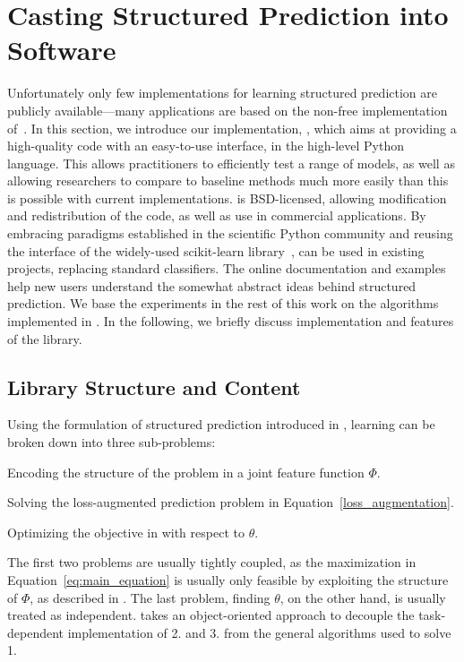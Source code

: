 \section{Casting Structured Prediction into Software}\label{sec:api}

Unfortunately only few implementations for learning structured prediction are
publicly available---many applications are based on the non-free implementation
of~\citet{joachims2009cutting}.
In this section, we introduce our implementation, \pystruct, which aims at
providing a high-quality code with an easy-to-use interface, in the high-level
Python language. This allows practitioners to efficiently test a range of
models, as well as allowing researchers to compare to baseline methods much
more easily than this is possible with current implementations. \pystruct is
BSD-licensed, allowing modification and redistribution of the code, as well as
use in commercial applications.  By embracing paradigms established in the
scientific Python community and reusing the interface of the widely-used {\sc
scikit-learn} library~\citep{pedregosa2011scikit}, \pystruct can be used in
existing projects, replacing standard classifiers. The online documentation and
examples help new users understand the somewhat abstract ideas behind
structured prediction.
We base the experiments in the rest of this work on the algorithms
implemented in \pystruct. In the following, we briefly discuss implementation
and features of the \pystruct library.

\subsection{Library Structure and Content}
Using the formulation of structured prediction introduced in
, learning can be broken down into three
sub-problems:
\begin{enumerate*}
    \item Encoding the structure of the problem in a joint feature function $\Phi$.
    \item Solving the loss-augmented prediction problem in Equation~\eqref{loss_augmentation}.
    \item Optimizing the objective in  with respect to $\theta$.
\end{enumerate*}
The first two problems are usually tightly coupled, as the maximization in
Equation~\ref{eq:main_equation} is usually only feasible by exploiting the
structure of $\Phi$, as described in . The last problem,
finding $\theta$, on the other hand, is usually treated as independent.
\pystruct takes an object-oriented approach to decouple the task-dependent
implementation of 2. and 3. from the general algorithms used to solve 1.


